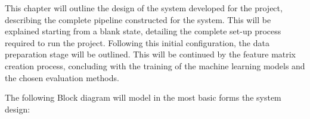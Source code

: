 \documentclass[12pt]{report} %
\begin{document}
This chapter will outline the design of the system developed for the project, describing the complete pipeline constructed for the system. This will be explained starting from a blank state, detailing the complete set-up process required to run the project. Following this initial configuration, the data preparation stage will be outlined. This will be continued by the feature matrix creation process, concluding with the training of the machine learning models and the chosen evaluation methods.

The following Block diagram will model in the most basic forms the system design:


\end{document}
